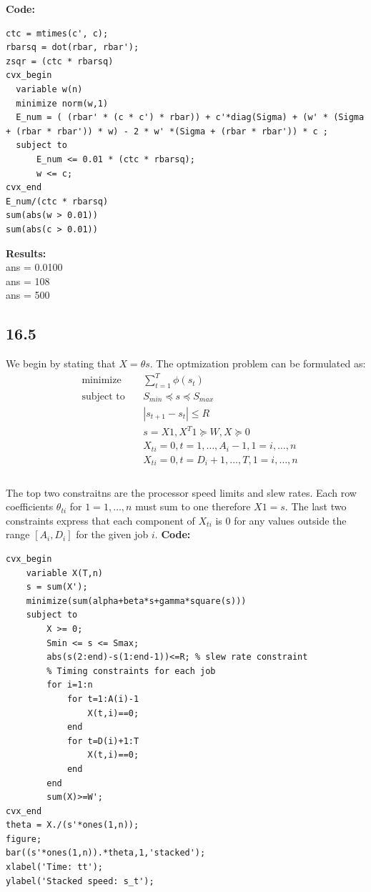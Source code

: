 \documentclass[12pt]{article}
\begin{document}
\textbf{Code:}\\
\begin{lstlisting}
ctc = mtimes(c', c);
rbarsq = dot(rbar, rbar');
zsqr = (ctc * rbarsq)
cvx_begin
  variable w(n)
  minimize norm(w,1)
  E_num = ( (rbar' * (c * c') * rbar)) + c'*diag(Sigma) + (w' * (Sigma + (rbar * rbar')) * w) - 2 * w' *(Sigma + (rbar * rbar')) * c ;
  subject to
      E_num <= 0.01 * (ctc * rbarsq);
      w <= c;
cvx_end
E_num/(ctc * rbarsq)
sum(abs(w > 0.01))
sum(abs(c > 0.01))
\end{lstlisting}
\textbf{Results:}\\
ans = 0.0100\\
ans = 108\\
ans = 500\\

\subsection*{16.5}
We begin by stating that $X = \theta s$. The optmization problem can be formulated as: 
\begin{equation*}
\begin{aligned}
& \underset{}{\text{minimize}}
& & \sum_{t=1}^{T}\phi(s_t) \\
& \text{subject to}\
& & S_{min} \preceq s \preceq S_{max}\\
&&& |s_{t+1}-s_t| \le R\\
&&& s = X1, X^T1 \succeq W, X \succeq 0\\
&&& X_{ti} = 0, t = 1,\dots, A_i-1, 1=i,\dots,n\\
&&& X_{ti} = 0, t = D_i+1,\dots, T, 1=i,\dots,n\\
\end{aligned}
\end{equation*}\\
The top two constraitns are the processor speed limits and slew rates. Each row coefficients $\theta_{ti}$ for $1=1,\dots,n$ must sum to one therefore $X1=s$. The last two constraints express that each component of  $X_{ti}$ is 0 for any values outside the range $[A_i,D_i]$ for the given job $i.$
\textbf{Code:}\\
\begin{lstlisting}
cvx_begin
    variable X(T,n)
    s = sum(X');
    minimize(sum(alpha+beta*s+gamma*square(s)))
    subject to
        X >= 0;
        Smin <= s <= Smax;
        abs(s(2:end)-s(1:end-1))<=R; % slew rate constraint
        % Timing constraints for each job
        for i=1:n
            for t=1:A(i)-1
                X(t,i)==0;
            end
            for t=D(i)+1:T
                X(t,i)==0;
            end
        end
        sum(X)>=W';
cvx_end
theta = X./(s'*ones(1,n));
figure;
bar((s'*ones(1,n)).*theta,1,'stacked');
xlabel('Time: tt');
ylabel('Stacked speed: s_t');
\end{lstlisting}
\end{document}
